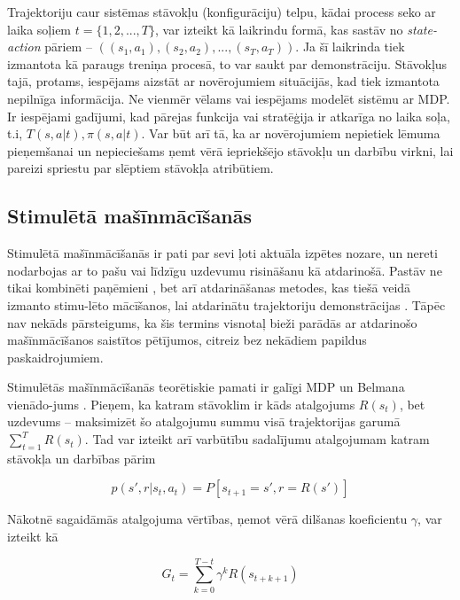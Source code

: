 \documentclass[12pt, a4paper]{article}
\numberwithin{equation}{section} %
\begin{document}
Trajektoriju caur sistēmas stāvokļu (konfigurāciju) telpu, kādai process seko ar laika soļiem $t = \lbrace 1, 2, ..., T \rbrace$, var izteikt kā laikrindu formā, kas sastāv no \textit{state-action} pāriem -- $((s_1, a_1), (s_2, a_2), ..., (s_T, a_T))$. Ja šī laikrinda tiek izmantota kā paraugs treniņa procesā, to var saukt par demonstrāciju. Stāvokļus tajā, protams, iespējams aizstāt ar novērojumiem situācijās, kad tiek izmantota nepilnīga informācija. Ne vienmēr vēlams vai iespējams modelēt sistēmu ar MDP. Ir iespējami gadījumi, kad pārejas funkcija vai stratēģija ir atkarīga no laika soļa, t.i, $T(s,a \vert t), \pi(s,a \vert t)$. Var būt arī tā, ka ar novērojumiem nepietiek lēmuma pieņemšanai un nepieciešams ņemt vērā iepriekšējo stāvokļu un darbību virkni, lai pareizi spriestu par slēptiem stāvokļa atribūtiem. 

\subsection{Stimulētā mašīnmācīšanās}

Stimulētā mašīnmācīšanās ir pati par sevi ļoti aktuāla izpētes nozare, un nereti nodarbojas ar to pašu vai līdzīgu uzdevumu risināšanu kā atdarinošā. Pastāv ne tikai kombinēti paņēmieni \cite{gupta2019relay, brown2019extrapolating}, bet arī atdarināšanas metodes, kas tiešā veidā izmanto stimu-lēto mācīšanos, lai atdarinātu trajektoriju demonstrācijas \cite{englert2018learning}. Tāpēc nav nekāds pārsteigums, ka šis termins visnotaļ bieži parādās ar atdarinošo mašīnmācīšanos saistītos pētījumos, citreiz bez nekādiem papildus paskaidrojumiem.

Stimulētās mašīnmācīšanās teorētiskie pamati ir galīgi MDP un Belmana vienādo-jums \cite{sutton2018reinforcement}. Pieņem, ka katram stāvoklim ir kāds atalgojums $R(s_t)$, bet uzdevums -- maksimizēt šo atalgojumu summu visā trajektorijas garumā $\sum_{t=1}^T R(s_t)$. Tad var izteikt arī varbūtību sadalījumu atalgojumam katram stāvokļa un darbības pārim

\begin{equation}
    p(s', r \vert s_t, a_t) = P[s_{t+1}=s', r=R(s')]
\end{equation}

Nākotnē sagaidāmās atalgojuma vērtības, ņemot vērā dilšanas koeficientu $\gamma$,  var izteikt kā

\begin{equation}
    G_t = \sum_{k=0}^{T-t} \gamma^k R(s_{t+k+1})
\end{equation}
\end{document}
